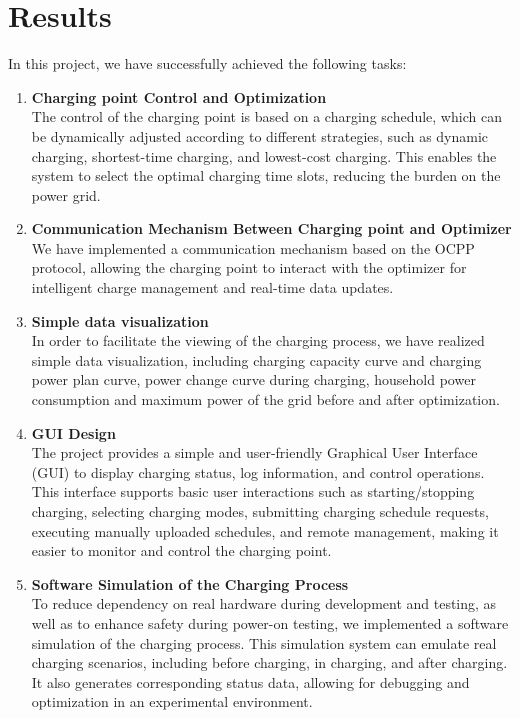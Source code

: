 \documentclass[
english,
ruledheaders=section,%
class=report,%
thesis={type=Report},%
accentcolor=9c,%
custommargins=true,%
marginpar=false,%
parskip=half-,%
fontsize=11pt,%
logofile={img/tuda_logo.pdf}, %
]{tudapub}
\begin{document}
        \section{Results}
        In this project, we have successfully achieved the following tasks:

        \begin{enumerate}
            \item \textbf{Charging point Control and Optimization}\\
            The control of the charging point is based on a charging schedule, which can be dynamically adjusted according to different strategies, such as dynamic charging, shortest-time charging, and lowest-cost charging. This enables the system to select the optimal charging time slots, reducing the burden on the power grid.

            \item \textbf{Communication Mechanism Between Charging point and Optimizer}\\
            We have implemented a communication mechanism based on the OCPP protocol, allowing the charging point to interact with the optimizer for intelligent charge management and real-time data updates.

            \item \textbf{Simple data visualization}\\
            In order to facilitate the viewing of the charging process, we have realized simple data visualization, including charging capacity curve and charging power plan curve, power change curve during charging, household power consumption and maximum power of the grid before and after optimization.

            \item \textbf{GUI Design}\\
            The project provides a simple and user-friendly Graphical User Interface (GUI) to display charging status, log information, and control operations. This interface supports basic user interactions such as starting/stopping charging, selecting charging modes, submitting charging schedule requests, executing manually uploaded schedules, and remote management, making it easier to monitor and control the charging point.

            \item \textbf{Software Simulation of the Charging Process}\\
            To reduce dependency on real hardware during development and testing, as well as to enhance safety during power-on testing, we implemented a software simulation of the charging process. This simulation system can emulate real charging scenarios, including before charging, in charging, and after charging. It also generates corresponding status data, allowing for debugging and optimization in an experimental environment.


\end{enumerate}
\end{document}
